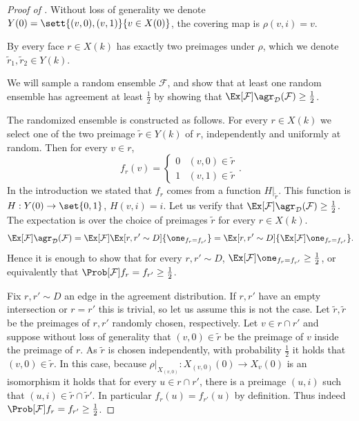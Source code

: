 \begin{proof}[Proof of ]
Without loss of generality we denote \(Y(0)=\sett{(v,0),(v,1)}{v \in X(0)}\), the covering map is \(\rho(v,i)=v\).

By  every face \(r \in X(k)\) has exactly two preimages under $\rho$, which we denote \(\tilde{r}_1,\tilde{r}_2 \in Y(k)\).

We will sample a random ensemble \(\mathcal{F}\), and show that at least one random ensemble has agreement at least \(\frac{1}{2}\) by showing that \(\Ex[\mathcal{F}]{\agr_{\mathcal{D}}(\mathcal{F})} \geq \frac{1}{2}\).

The randomized ensemble is constructed as follows. For every \(r \in X(k)\) we select one of the two preimage \(\tilde{r} \in Y(k)\) of \(r\), independently and uniformly at random. Then for every \(v \in r\), 
\[f_r(v) = \begin{cases} 0 & (v,0) \in \tilde{r} \\ 1 & (v,1) \in \tilde{r} \end{cases}.\]
In the introduction we stated that \(f_r\) comes from a function \(H|_{\tilde{r}}\). This function is \(H:Y(0) \to \set{0,1}\), \(H(v,i)=i\). 
Let us verify that \(\Ex[\mathcal{F}]{\agr_{\mathcal{D}}(\mathcal{F})} \geq \frac{1}{2}\). The expectation is over the choice of preimages \(\tilde{r}\) for every \(r \in X(k)\).
\[\Ex[\mathcal{F}]{\agr_{\mathcal{D}}(\mathcal{F})} = \Ex[\mathcal{F}]{\Ex[r,r' \sim D]{\one_{f_r = f_{r'}}}} = \Ex[r,r' \sim D]{\Ex[\mathcal{F}]{\one_{f_r = f_{r'}}}}.\]
Hence it is enough to show that for every \(r,r' \sim D\), \(\Ex[\mathcal{F}]{\one_{f_r = f_{r'}}} \geq \frac{1}{2}\), or equivalently that \(\Prob[\mathcal{F}]{f_r = f_{r'}} \geq \frac{1}{2}\).

Fix \(r,r' \sim D\) an edge in the agreement distribution. If \(r,r'\) have an empty intersection or \(r=r'\) this is trivial, so let us assume this is not the case.
Let \(\tilde{r}, \tilde{r}\) be the preimages of \(r,r'\) randomly chosen, respectively. Let \(v \in r \cap r'\) and suppose without loss of generality that \((v,0) \in \tilde{r}\) be the preimage of \(v\) inside the preimage of \(r\). As \(\tilde{r}\) is chosen independently, with probability \(\frac{1}{2}\) it holds that \((v,0) \in \tilde{r}\). In this case, because \(\rho|_{X_{(v,0) }}:X_{(v,0) }(0) \to X_{v}(0)\) is an isomorphism it holds that for every \(u \in r \cap r'\), there is a preimage \((u,i)\) such that \((u,i) \in \tilde{r} \cap \tilde{r}'\). In particular \(f_r(u)=f_{r'}(u)\) by definition. Thus indeed \(\Prob[\mathcal{F}]{f_r = f_{r'}} \geq \frac{1}{2}\).


\end{proof}
